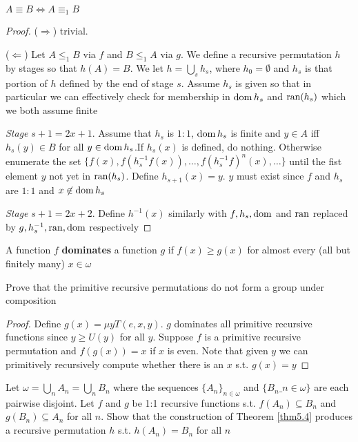 \documentclass[11pt]{article}
\begin{document}
\begin{theorem}
\label{thm5.4}
\(A\equiv B\Longleftrightarrow A\equiv_1 B\)
\end{theorem}
\begin{proof}
(\(\Longrightarrow\)) trivial.

(\(\Longleftarrow\)) Let \(A\le_1 B\) via \(f\) and \(B\le_1 A\) via \(g\). We define a
recursive permutation \(h\) by stages so that \(h(A)=B\). We let
\(h=\bigcup_sh_s\), where \(h_0=\emptyset\) and \(h_s\) is that portion of \(h\)
defined by the end of stage \(s\). Assume \(h_s\) is given so that in particular
we can effectively check for membership in \(\operatorname{dom}{h_s}\) and \(\operatorname{ran}(h_s)\) which
we both assume finite

\emph{Stage} \(s+1=2x+1\). Assume that \(h_s\) is \(1:1\), \(\operatorname{dom}{h_s}\) is finite and \(y\in
   A\) iff \(h_s(y)\in B\) for all \(y\in\operatorname{dom}{h_s}\).If \(h_s(x)\) is defined, do
nothing. Otherwise enumerate the set
\(\{f(x),f(h_s^{-1}f(x)),\dots,f(h_s^{-1}f)^n(x),\dots\}\) until the fist
element \(y\) not yet in \(\operatorname{ran}(h_s)\). Define \(h_{s+1}(x)=y\). \(y\) must exist
since \(f\) and \(h_s\) are \(1:1\) and \(x\not\in\operatorname{dom}{h_s}\)

\emph{Stage} \(s+1=2x+2\). Define \(h^{-1}(x)\) similarly with \(f,h_s,\operatorname{dom}\) and
\(\operatorname{ran}\) replaced by \(g,h_s^{-1},\operatorname{ran},\operatorname{dom}\) respectively
\end{proof}

\begin{definition}[]
A function \(f\) \textbf{dominates} a function \(g\) if \(f(x)\ge g(x)\) for almost every
(all but finitely many) \(x\in\omega\)
\end{definition}

\begin{exercise}[$\times$]
Prove that the primitive recursive permutations do not form a group under composition
\end{exercise}
\begin{proof}
Define \(g(x)=\mu yT(e,x,y)\). \(g\) dominates all primitive recursive functions
since \(y\ge U(y)\) for all \(y\). Suppose \(f\) is a primitive recursive
permutation and \(f(g(x))=x\) if \(x\) is even. Note that given \(y\) we can
primitively recursively compute whether there is an \(x\) s.t. \(g(x)=y\)
\end{proof}

\begin{exercise}
Let \(\omega=\bigcup_nA_n=\bigcup_nB_n\) where the sequences
\(\{A_n\}_{n\in\omega}\) and \(\{B_n\_{n\in\omega}\}\) are each pairwise disjoint.
Let \(f\) and \(g\) be 1:1 recursive functions s.t. \(f(A_n)\subseteq B_n\) and
\(g(B_n)\subseteq A_n\) for all \(n\). Show that the construction of Theorem
\ref{thm5.4} produces a recursive permutation \(h\) s.t. \(h(A_n)=B_n\) for all \(n\)
\end{exercise}
\end{document}
